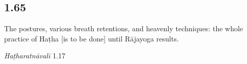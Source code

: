\begin{ekdosis}
\subsection*{1.65}
\begin{translation}[hp01_065]
The postures, various breath retentions, and heavenly techniques: the whole practice of Haṭha [is to be done] until Rājayoga results. 
\end{translation}

\begin{sources}[hp01_065]
\end{sources}

\begin{testimonia}[hp01_065]
\emph{Haṭharatnāvalī} 1.17

\begin{versinnote}
\end{versinnote}

\end{testimonia}


\end{ekdosis}

